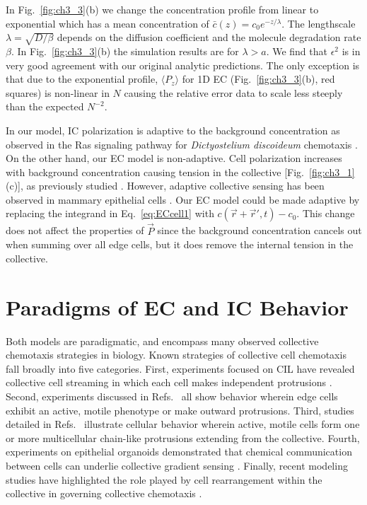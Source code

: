 In Fig.\ \ref{fig:ch3_3}(b) we change the concentration profile from linear to exponential which has a mean concentration of
$\bar{c}(z) = c_0 e^{-z/\lambda}$.
The lengthscale $\lambda=\sqrt{D/\beta}$ depends on the diffusion coefficient and the molecule degradation rate $\beta$. In Fig.\ \ref{fig:ch3_3}(b) the simulation results are for $\lambda > a$. We find that $\epsilon^2$ is in very good agreement with our original analytic predictions. The only exception is that due to the exponential profile, $\langle P_z \rangle$ for 1D EC (Fig.\ \ref{fig:ch3_3}(b), red squares) is non-linear in $N$ causing the relative error data to scale less steeply than the expected $N^{-2}$.

In our model, IC polarization is adaptive to the background concentration as observed in the Ras signaling pathway for \textit{Dictyostelium discoideum} chemotaxis \cite{takeda2012incoherent}. On the other hand, our EC model is non-adaptive. Cell polarization increases with background concentration causing tension in the collective [Fig.\ \ref{fig:ch3_1}(c)], as previously studied \cite{camley2016emergent}. However, adaptive collective sensing has been observed in mammary epithelial cells \cite{ellison2016cell}. Our EC model could be made adaptive by replacing the integrand in Eq.\ \ref{eq:ECcell1} with
$c(\vec{r}+\vec{r}',t)-c_0$.
This change does not affect the properties of $\vec{P}$ since the background concentration cancels out when summing over all edge cells, but it does remove the internal tension in the collective.

\section{Paradigms of EC and IC Behavior}

Both models are paradigmatic, and encompass many observed collective chemotaxis strategies in biology.
Known strategies of collective cell chemotaxis fall broadly into five categories. First, experiments focused on CIL have revealed collective cell streaming in which each cell makes independent protrusions \cite{mayor2010keeping}. Second, experiments discussed in Refs.\
\cite{cai2016modeling,friedl2009collective,haeger2015collective,malet2015collective}
all show behavior wherein edge cells exhibit an active, motile phenotype or make outward protrusions. Third, studies detailed in Refs.\
\cite{theveneau2010collective,friedl2012classifying,cheung2013collective}
illustrate cellular behavior wherein active, motile cells form one or more multicellular chain-like protrusions extending from the collective. Fourth, experiments on epithelial organoids demonstrated that chemical communication between cells can underlie collective gradient sensing \cite{ellison2016cell}. Finally, recent modeling studies have highlighted the role played by cell rearrangement within the collective in governing collective chemotaxis
\cite{camley2016emergent,camley2016collective}.

